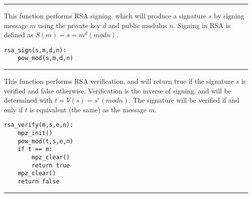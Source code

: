 \documentclass[
	12pt, %
]{fphw}
\begin{document}
\noindent\rule{6.3in}{0.4pt}

This function performs RSA signing, which will produce a signature $s$ by signing message $m$ using the private key $d$ and public modulus $n$. Signing in RSA is defined as $S(m) = s = m^d (mod n)$.
\begin{lstlisting}[mathescape=true]
rsa_sign(s,m,d,n):
	pow_mod(s,m,d,n)
\end{lstlisting}

\noindent\rule{6.3in}{0.4pt}

This function performs RSA verification, and will return true if the signature $s$ is verified and false otherwise. Verification is the inverse of signing, and will be determined with $t = V(s) = s^e (mod n)$. The signature will be verified if and only if $t$ is equivalent (the same) as the message $m$.
\begin{lstlisting}[mathescape=true]
rsa_verify(m,s,e,n):
	mpz_init()
	pow_mod(t,s,e,n)
	if t == m:
		mpz_clear()
		return true
	mpz_clear()
	return false
\end{lstlisting}

\noindent\rule{6.3in}{0.4pt}

\end{document}
